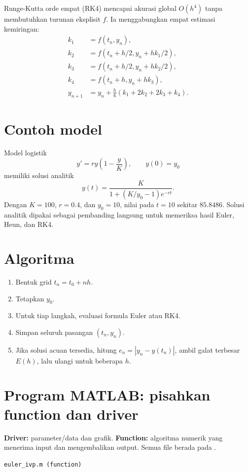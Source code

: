\documentclass[book,english,noindex,lean,nobackpage,nocopyright,noupdate,nofiglist,notablist]{enacom}
\newcommand{\MatlabFile}[1]{\par\smallskip\noindent\texttt{#1}\par}
\begin{document}
Runge-Kutta orde empat (RK4) mencapai akurasi global $O(h^4)$ tanpa membutuhkan turunan eksplisit $f$. Ia menggabungkan empat estimasi kemiringan:
\begin{align}
k_1&=f(t_n,y_n),\\
k_2&=f(t_n+h/2,y_n+hk_1/2),\\
k_3&=f(t_n+h/2,y_n+hk_2/2),\\
k_4&=f(t_n+h,y_n+hk_3),\\
y_{n+1}&=y_n+\frac{h}{6}(k_1+2k_2+2k_3+k_4).
\end{align}

\section{Contoh model}
Model logistik
\begin{equation}
y'=r y\left(1-\frac{y}{K}\right),\qquad y(0)=y_0
\end{equation}
memiliki solusi analitik
\begin{equation}
y(t)=\frac{K}{1+(K/y_0-1)e^{-rt}}.
\end{equation}
Dengan $K=100$, $r=0.4$, dan $y_0=10$, nilai pada $t=10$ sekitar $85.8486$. Solusi analitik dipakai sebagai pembanding langsung untuk memeriksa hasil Euler, Heun, dan RK4.

\section{Algoritma}
\begin{enumerate}
\item Bentuk grid $t_n=t_0+nh$.
\item Tetapkan $y_0$.
\item Untuk tiap langkah, evaluasi formula Euler atau RK4.
\item Simpan seluruh pasangan $(t_n,y_n)$.
\item Jika solusi acuan tersedia, hitung $e_n=|y_n-y(t_n)|$, ambil galat terbesar $E(h)$, lalu ulangi untuk beberapa $h$.
\end{enumerate}

\section{Program MATLAB: pisahkan function dan driver}
\textbf{Driver:} parameter/data dan grafik. \textbf{Function:} algoritma numerik yang menerima input dan mengembalikan output. Semua file berada pada .

\MatlabFile{euler\_ivp.m (function)}

\end{document}
